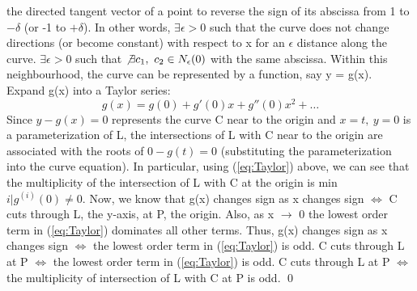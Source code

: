 the directed tangent vector of a point to reverse the sign of its
abscissa from 1 to $-\delta$ (or -1 to $+\delta$).
In other words, $\exists \epsilon > 0$ such that the curve does not
change directions (or become constant) with respect to x for an
$\epsilon$ distance along the curve.
\hence $\exists \epsilon > 0$ such that $\not\exists c_{1},\ c_{2} \in
N_{\epsilon}(0)$ with the same abscissa.
Within this neighbourhood, 
the curve can be represented by a function,
say y = g(x).\vspace{.25in} \\
Expand g(x) into a Taylor series:
\begin{equation}
\label{eq:Taylor}
g(x) = g(0) + g'(0)x + g''(0)x^2 + \ldots  
\end{equation}
Since $y-g(x) = 0$ represents the curve C near to the origin
and $x=t,\ y=0$ is a parameterization of L, the intersections of L
with C near to the origin are associated with the roots of $0-g(t)=0$
(substituting the parameterization into the curve equation).
In particular, using (\ref{eq:Taylor}) above, we can see that the
multiplicity of the intersection of L with C at the origin is
min ${i|g^{(i)}(0) \neq 0}$.
Now, we know that g(x) changes sign as x changes sign $\Leftrightarrow$
C cuts through L, the y-axis, at P, the origin.
Also, as x $\rightarrow$ 0 the lowest order term in (\ref{eq:Taylor})
dominates all other terms.
Thus, g(x) changes sign as x changes sign $\Leftrightarrow$ the lowest
order term in (\ref{eq:Taylor}) is odd.
\hence C cuts through L at P $\Leftrightarrow$ the lowest order term
in (\ref{eq:Taylor}) is odd.
\hence C cuts through L at P $\Leftrightarrow$ the multiplicity
of intersection of L with C at P is odd.
\qed
